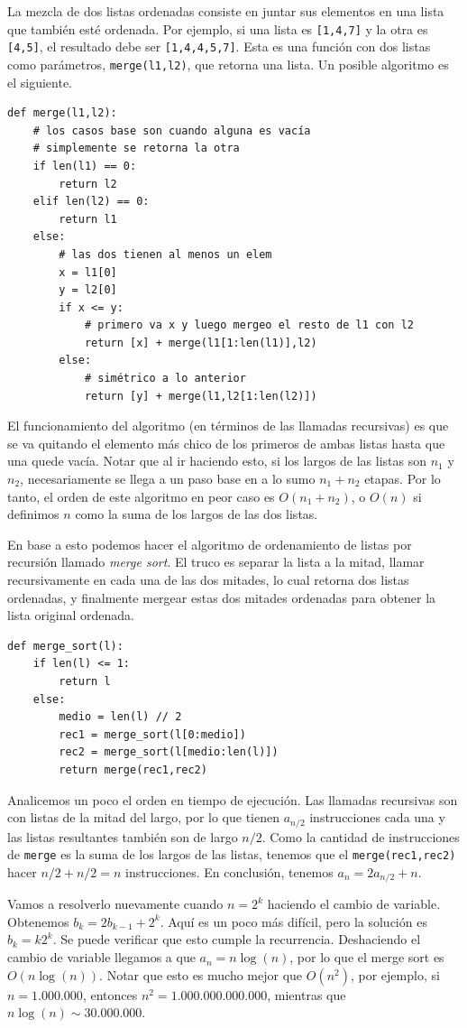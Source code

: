 \documentclass[a4paper, 12pt]{report}
\theoremstyle{definition}
\begin{document}
La mezcla de dos listas ordenadas consiste en juntar sus elementos en una lista que también esté ordenada. Por ejemplo, si una lista es {\tt[1,4,7]} y la otra es {\tt [4,5]}, el resultado debe ser {\tt[1,4,4,5,7]}. Esta es una función con dos listas como parámetros, {\tt merge(l1,l2)}, que retorna una lista. Un posible algoritmo es el siguiente.
\begin{verbatim}
def merge(l1,l2):
    # los casos base son cuando alguna es vacía
    # simplemente se retorna la otra
    if len(l1) == 0:
        return l2
    elif len(l2) == 0:
        return l1
    else:
        # las dos tienen al menos un elem
        x = l1[0]
        y = l2[0]
        if x <= y:
            # primero va x y luego mergeo el resto de l1 con l2
            return [x] + merge(l1[1:len(l1)],l2)
        else:
            # simétrico a lo anterior
            return [y] + merge(l1,l2[1:len(l2)])
\end{verbatim}
El funcionamiento del algoritmo (en términos de las llamadas recursivas) es que se va quitando el elemento más chico de los primeros de ambas listas hasta que una quede vacía. Notar que al ir haciendo esto, si los largos de las listas son $n_1$ y $n_2$, necesariamente se llega a un paso base en a lo sumo $n_1 + n_2$ etapas. Por lo tanto, el orden de este algoritmo en peor caso es $O(n_1+n_2)$, o $O(n)$ si definimos $n$ como la suma de los largos de las dos listas.

En base a esto podemos hacer el algoritmo de ordenamiento de listas por recursión llamado {\sl merge sort}. El truco es separar la lista a la mitad, llamar recursivamente en cada una de las dos mitades, lo cual retorna dos listas ordenadas, y finalmente mergear estas dos mitades ordenadas para obtener la lista original ordenada.
\begin{verbatim}
def merge_sort(l):
    if len(l) <= 1:
        return l
    else:
        medio = len(l) // 2
        rec1 = merge_sort(l[0:medio])
        rec2 = merge_sort(l[medio:len(l)])
        return merge(rec1,rec2)
\end{verbatim}
Analicemos un poco el orden en tiempo de ejecución. Las llamadas recursivas son con listas de la mitad del largo, por lo que tienen $a_{n/2}$ instrucciones cada una y las listas resultantes también son de largo $n/2$. Como la cantidad de instrucciones de {\tt merge} es la suma de los largos de las listas, tenemos que el {\tt merge(rec1,rec2)} hacer $n/2+n/2=n$ instrucciones. En conclusión, tenemos $a_n = 2a_{n/2} + n$.

Vamos a resolverlo nuevamente cuando $n=2^k$ haciendo el cambio de variable. Obtenemos $b_k = 2b_{k-1} + 2^k$. Aquí es un poco más difícil, pero la solución es $b_k = k2^k$. Se puede verificar que esto cumple la recurrencia. Deshaciendo el cambio de variable llegamos a que $a_n = n\log(n)$, por lo que el merge sort es $O(n\log(n))$. Notar que esto es mucho mejor que $O(n^2)$, por ejemplo, si $n = 1.000.000$, entonces $n^2= 1.000.000.000.000$, mientras que $n\log(n)\sim30.000.000$.
\end{document}
